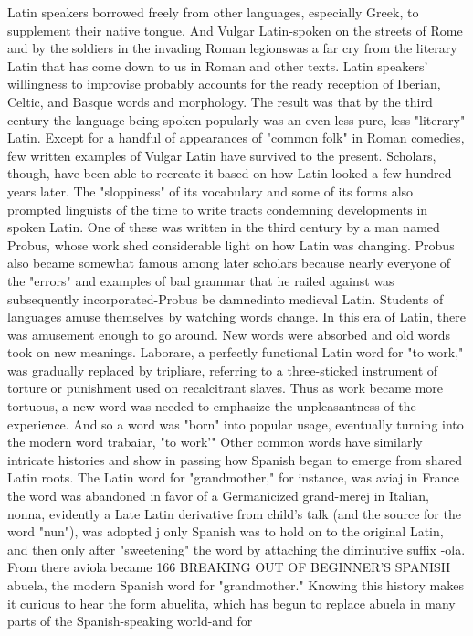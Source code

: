 Latin speakers borrowed freely from other languages, especially Greek,
to supplement their native tongue. And Vulgar Latin-spoken on the
streets of Rome and by the soldiers in the invading Roman legionswas a far cry from the literary Latin that has come down to us in Roman and other texts. Latin speakers' willingness to improvise probably
accounts for the ready reception of Iberian, Celtic, and Basque words
and morphology. The result was that by the third century the language
being spoken popularly was an even less pure, less "literary" Latin.
Except for a handful of appearances of "common folk" in Roman comedies, few written examples of Vulgar Latin have survived
to the present. Scholars, though, have been able to recreate it based
on how Latin looked a few hundred years later. The "sloppiness" of
its vocabulary and some of its forms also prompted linguists of the
time to write tracts condemning developments in spoken Latin. One
of these was written in the third century by a man named Probus,
whose work shed considerable light on how Latin was changing. Probus also became somewhat famous among later scholars because
nearly everyone of the "errors" and examples of bad grammar that he
railed against was subsequently incorporated-Probus be damnedinto medieval Latin.
Students of languages amuse themselves by watching words
change. In this era of Latin, there was amusement enough to go
around. New words were absorbed and old words took on new meanings. Laborare, a perfectly functional Latin word for "to work," was
gradually replaced by tripliare, referring to a three-sticked instrument
of torture or punishment used on recalcitrant slaves. Thus as work
became more tortuous, a new word was needed to emphasize the unpleasantness of the experience. And so a word was "born" into popular
usage, eventually turning into the modern word trabaiar, "to work'"
Other common words have similarly intricate histories and
show in passing how Spanish began to emerge from shared Latin roots.
The Latin word for "grandmother," for instance, was aviaj in France
the word was abandoned in favor of a Germanicized grand-merej in
Italian, nonna, evidently a Late Latin derivative from child's talk (and
the source for the word "nun"), was adopted j only Spanish was to hold
on to the original Latin, and then only after "sweetening" the word
by attaching the diminutive suffix -ola. From there aviola became
166 BREAKING OUT OF BEGINNER'S SPANISH
abuela, the modern Spanish word for "grandmother." Knowing this
history makes it curious to hear the form abuelita, which has begun to
replace abuela in many parts of the Spanish-speaking world-and for
